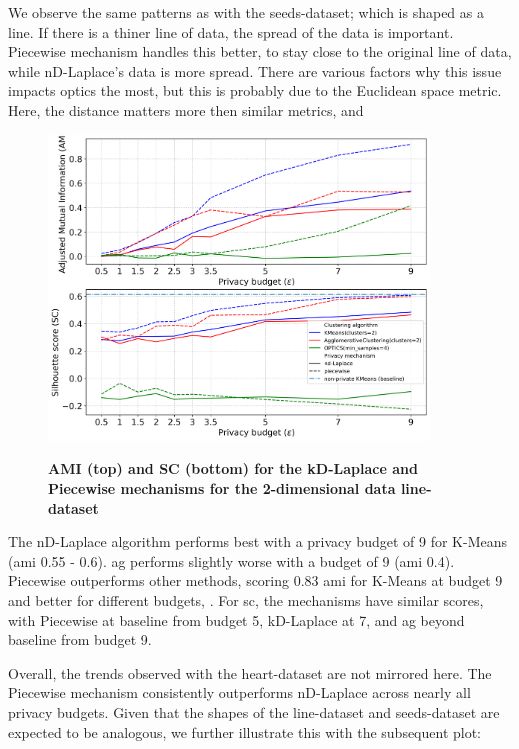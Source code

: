 We observe the same patterns as with the seeds-dataset; which is shaped as a line.
If there is a thiner line of data, the spread of the data is important. Piecewise mechanism handles this better, to stay close to the original line of data, while nD-Laplace's data is more spread. There are various factors why this issue impacts \gls{optics} the most, but this is probably due to the Euclidean space metric. Here, the distance matters more then similar metrics, and 
\newpage
\begin{figure}[H]
  \centering
  \caption{\textbf{AMI (top) and SC (bottom) for the kD-Laplace and Piecewise mechanisms for the 2-dimensional data line-dataset}}
  \includegraphics[width=0.9\textwidth]{Results/nd-laplace/nd-Laplace/line-dataset/ami-and-sc_2_dimensions.png}
  \label{fig:validation-line-dataset_comparison_2d-laplace}
\end{figure}
The nD-Laplace algorithm performs best with a privacy budget of 9 for K-Means (\gls{ami} 0.55 - 0.6).
\gls{ag} performs slightly worse with a budget of 9 (\gls{ami} 0.4).
Piecewise outperforms other methods, scoring 0.83 \gls{ami} for K-Means at budget 9 and better for different budgets, .
For \gls{sc}, the mechanisms have similar scores, with Piecewise at baseline from budget 5, kD-Laplace at 7, and \gls{ag} beyond baseline from budget 9. 

Overall, the trends observed with the heart-dataset are not mirrored here. The Piecewise mechanism consistently outperforms nD-Laplace across nearly all privacy budgets. Given that the shapes of the line-dataset and seeds-dataset are expected to be analogous, we further illustrate this with the subsequent plot:

